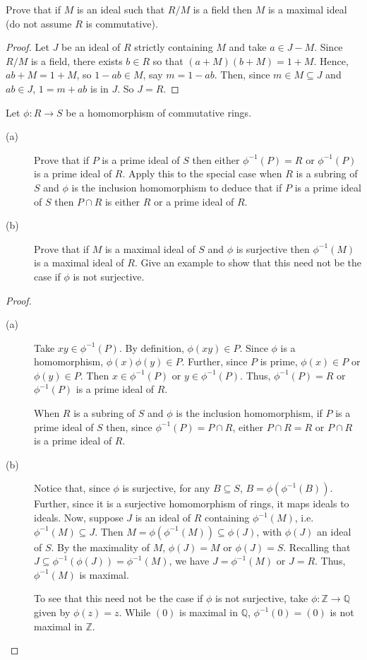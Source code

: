 \documentclass[12pt,leqno]{book}
\numberwithin{equation}{section}
\newcommand{\question}[2] {\vspace{.25in}\noindent\fbox{#1} #2 \vspace{.10in}}
\theoremstyle{definition}
\begin{document}
\question{5.}{Prove that if $M$ is an ideal such that $R/M$ is a field then $M$ is a maximal ideal (do not assume $R$ is commutative).}

\begin{proof}
 Let $J$ be an ideal of $R$ strictly containing $M$ and take $a\in J-M$. Since $R/M$ is a field, there exists $b\in R$ so that $(a+M)(b+M)=1+M$. Hence, $ab+M=1+M$, so $1-ab\in M$, say $m=1-ab$. Then, since $m\in M\subseteq J$ and $ab\in J$, $1=m+ab$ is in $J$. So $J=R$.
\end{proof}

\question{13.}{Let $\phi:R\to S$ be a homomorphism of commutative rings.}
\begin{description}
 \item [(a)] Prove that if $P$ is a prime ideal of $S$ then either $\phi^{-1}(P)=R$ or $\phi^{-1}(P)$ is a prime ideal of $R$. Apply this to the special case when $R$ is a subring of $S$ and $\phi$ is the inclusion homomorphism to deduce that if $P$ is a prime ideal of $S$ then $P\cap R$ is either $R$ or a prime ideal of $R$.
 \item [(b)] Prove that if $M$ is a maximal ideal of $S$ and $\phi$ is surjective then $\phi^{-1}(M)$ is a maximal ideal of $R$. Give an example to show that this need not be the case if $\phi$ is not surjective.
\end{description}

\begin{proof}\indent
 \begin{description}
  \item [(a)] Take $xy\in\phi^{-1}(P)$. By definition, $\phi(xy)\in P$. Since $\phi$ is a homomorphism, $\phi(x)\phi(y)\in P$. Further, since $P$ is prime, $\phi(x)\in P$ or $\phi(y)\in P$. Then $x\in\phi^{-1}(P)$ or $y\in\phi^{-1}(P)$. Thus, $\phi^{-1}(P)=R$ or $\phi^{-1}(P)$ is a prime ideal of $R$.

When $R$ is a subring of $S$ and $\phi$ is the inclusion homomorphism, if $P$ is a prime ideal of $S$ then, since $\phi^{-1}(P)=P\cap R$, either $P\cap R=R$ or $P\cap R$ is a prime ideal of $R$.
  \item [(b)] Notice that, since $\phi$ is surjective, for any $B\subseteq S$, $B=\phi(\phi^{-1}(B))$. Further, since it is a surjective homomorphism of rings, it maps ideals to ideals. Now, suppose $J$ is an ideal of $R$ containing $\phi^{-1}(M)$, i.e. $\phi^{-1}(M)\subseteq J$. Then $M=\phi(\phi^{-1}(M))\subseteq\phi(J)$, with $\phi(J)$ an ideal of $S$. By the maximality of $M$, $\phi(J)=M$ or $\phi(J)=S$. Recalling that $J\subseteq\phi^{-1}(\phi(J))=\phi^{-1}(M)$, we have $J=\phi^{-1}(M)$ or $J=R$. Thus, $\phi^{-1}(M)$ is maximal. 

To see that this need not be the case if $\phi$ is not surjective, take $\phi:\mathbb{Z}\to\mathbb{Q}$ given by $\phi(z)=z$. While $(0)$ is maximal in $\mathbb{Q}$, $\phi^{-1}(0)=(0)$ is not maximal in $\mathbb{Z}$.\qedhere
 \end{description}

\end{proof}
\end{document}
